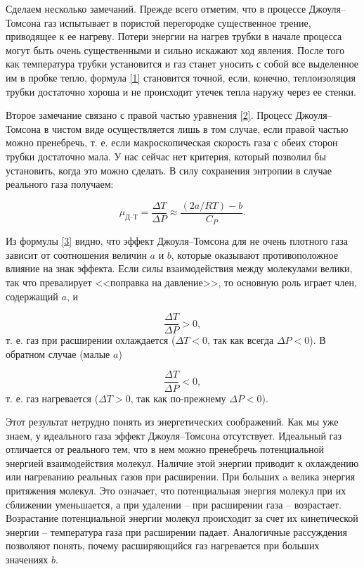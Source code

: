 \documentclass[12pt]{article}
\begin{document}
Сделаем несколько замечаний. Прежде всего отметим, что в процессе Джоуля–Томсона газ испытывает в пористой перегородке существенное трение, приводящее к ее нагреву. Потери энергии на нагрев трубки в начале процесса могут быть очень существенными и сильно искажают ход явления. После того как температура трубки установится и газ станет уносить с собой все выделенное им в пробке тепло, формула \ref{1} становится точной, если, конечно, теплоизоляция трубки достаточно хороша и не происходит утечек тепла наружу через ее стенки.

Второе замечание связано с правой частью уравнения \ref{2}. Процесс Джоуля–Томсона в чистом виде осуществляется лишь в том случае, если правой частью можно пренебречь, т. е. если макроскопическая скорость газа с обеих сторон трубки достаточно мала. У нас сейчас нет критерия, который позволил бы установить, когда это можно сделать. В силу сохранения энтропии в случае реального газа получаем:

\begin{equation}\label{3}
    \mu_\text{Д--Т} = \frac{\Delta T}{\Delta P} \approx \frac{(2a/RT) - b}{C_P}.
\end{equation}

Из формулы \ref{3} видно, что эффект Джоуля–Томсона для не очень плотного газа зависит от соотношения величин $ a $ и $ b $, которые оказывают противоположное влияние на знак эффекта. Если силы взаимодействия между молекулами велики, так что превалирует <<поправка на давление>>, то основную роль играет член, содержащий $ a $, и 

\[ \frac{\Delta T}{\Delta P} > 0, \]
т. е. газ при расширении охлаждается ($ \Delta T < 0 $, так как всегда $ \Delta P < 0 $). В обратном случае (малые $ a $)

\[ \frac{\Delta T}{\Delta P} < 0, \]
т. е. газ нагревается ($ \Delta T > 0 $, так как по-прежнему $ \Delta P < 0 $).

Этот результат нетрудно понять из энергетических соображений. Как мы уже знаем, у идеального газа эффект Джоуля–Томсона отсутствует. Идеальный газ отличается от реального тем, что в нем можно пренебречь потенциальной энергией взаимодействия молекул. Наличие этой энергии приводит к охлаждению или нагреванию реальных газов при расширении. При больших a велика энергия притяжения молекул. Это означает, что потенциальная энергия молекул при их сближении уменьшается, а при удалении -- при расширении газа -- возрастает. Возрастание потенциальной энергии молекул происходит за счет их кинетической энергии -- температура газа при расширении падает. Аналогичные рассуждения позволяют понять, почему расширяющийся газ нагревается при больших значениях $ b $.
\end{document}
